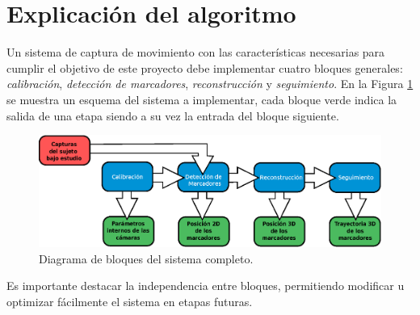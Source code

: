 \section{Explicación del algoritmo}\label{implementacion}
Un sistema de captura de movimiento con las características necesarias para cumplir el objetivo de este proyecto debe implementar cuatro bloques generales: \emph{calibración}, \emph{detección de marcadores}, \emph{reconstrucción} y \emph{seguimiento}. En la Figura \ref{bloquesSist} se muestra un esquema del sistema a implementar, cada bloque verde indica la salida de una etapa siendo  a su vez la entrada del bloque siguiente.
\begin{figure}[ht!]
\centering
\hspace{-0.5cm}
\includegraphics[scale=0.4]{imagenes/Sistema_completo/Diagrama_de_bloques.eps}
\caption{Diagrama de bloques del sistema completo.}
\label{bloquesSist}
\end{figure}

Es importante destacar la independencia entre bloques, permitiendo modificar u optimizar fácilmente el sistema en etapas futuras.

